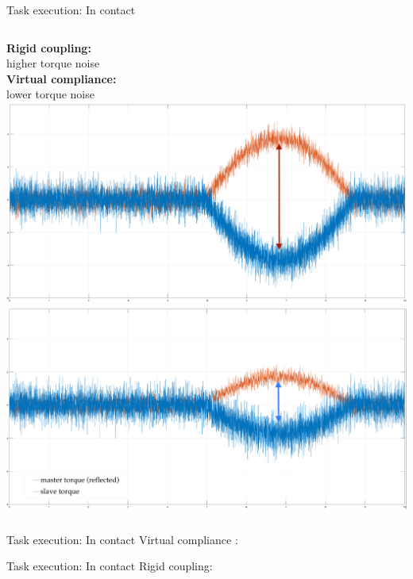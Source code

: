 \documentclass[10pt]{beamer}
\begin{document}
\begin{frame}{Task execution: In contact}
  \smallskip
  \begin{columns}
    \color{Orange}\textbf{Rigid coupling:}\\
    higher torque noise\\
    \bigskip
    \bigskip
    \bigskip
    \color{LightBlue}\textbf{Virtual compliance:}\\
    lower torque noise
    \includegraphics[width=\textwidth,
    height=0.43\textwidth]{../reportTeleop/Images/rigidContactReacTorArrow}
    \smallskip
    \includegraphics[width=\textwidth,
    height=0.43\textwidth]{../reportTeleop/Images/setPointContactReacTorArrow}\\

 \end{columns}
\end{frame}


\begin{frame}{Task execution: In contact}
  \color{LightBlue} Virtual compliance :
 \begin{center}
 \end{center}
\end{frame}

\begin{frame}{Task execution: In contact}
  \color{Orange} Rigid coupling:
 \begin{center}
 \end{center}
\end{frame}
\end{document}

